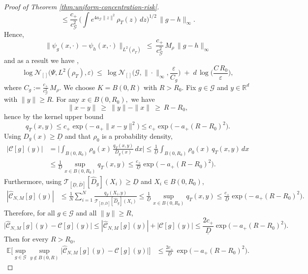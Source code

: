 \documentclass[11pt]{article}
\theoremstyle{remark}
\numberwithin{equation}{section}
\newcommand{\R}{\mathbb{R}}
\def\amax{a_{+}}
\def\cmax{c_{+}}
\def\aGmin{a_{\mathcal{G}}}
\def\cGmin{c_{\mathcal{G}}}
\begin{document}
\begin{proof}[Proof of Theorem \ref{thm:uniform-concentration-risk}]
\[  \le
  \frac{\cmax}{\cGmin^2}\,
  \Big(\int e^{4\aGmin\|z\|^2}\rho_T(z)\,dz\Big)^{1/2}\,
  \|g-h\|_\infty.
\]
Hence,
\begin{equation*}\label{eq:Psi-L2-Lip-infty}
  \|\psi_g(x,\cdot)-\psi_h(x,\cdot)\|_{L^2(\rho_T)}
  \ \le\
  \frac{\cmax}{\cGmin^2}\,M_\rho\,\|g-h\|_\infty
\end{equation*}
and as a result we have ,
\[
  \log \mathcal N_{[]}\!\big(\Psi,L^2(\rho_T), \varepsilon\big)
  \ \le\
  \log \mathcal N_{[]}\!\Big(\mathcal G,\|\cdot\|_\infty,\frac{\varepsilon}{C_g}\Big)
  \;+\;
  d\,\log\!\Big(\frac{C\,R_0}{\varepsilon}\Big),
\]
where \( C_g:=\frac{\cmax}{\cGmin^2}\,M_\rho.\)
We choose $K = B(0, R)$ with $R>R_0.$ Fix $g\in\mathcal G$ and $y\in\R^d$ with $\|y\|\ge R$. For any $x\in B(0,R_0),$ we have
\[
  \|x-y\|\ \ge\ \|y\|-\|x\|\ \ge\ R-R_0,
\]
hence by the kernel upper bound
\[
  q_T(x,y)\le \cmax \exp\!\bigl(-\amax\|x-y\|^2\bigr)
  \le \cmax \exp\!\bigl(-\amax (R-R_0)^2\bigr).
\]
Using $D_g(x)\ge \underline D$ and that $\rho_0$ is a probability density,
\begin{align*}
  |\mathcal C[g](y)|
  &=
  \Big|\int_{B(0,R_0)} \rho_0(x)\,\frac{q_T(x,y)}{D_g(x)}\,dx\Big|
  \le
  \frac{1}{\underline D}\int_{B(0,R_0)}\rho_0(x)\,q_T(x,y)\,dx\\
  &\le
  \frac{1}{\underline D}\sup_{x\in B(0,R_0)}q_T(x,y)
  \le
  \frac{\cmax}{\underline D}\exp\!\bigl(-\amax (R-R_0)^2\bigr).
\end{align*}
Furthermore, using $\mathcal{T}_{[\underline{D},\overline{D}]}[\widehat D_g](X_i)\ge \underline D$ and $X_i\in B(0,R_0)$,
\begin{align*}
  |\widehat{\mathcal C}_{N,M}[g](y)|
  &\le
  \frac{1}{N}\sum_{i=1}^N \frac{q_T(X_i,y)}{\mathcal{T}_{[\underline{D},\overline{D}]}[\widehat D_g](X_i)}
  \le
  \frac{1}{\underline D}\sup_{x\in B(0,R_0)} q_T(x,y)
  \le
  \frac{\cmax}{\underline D}\exp\!\bigl(-\amax (R-R_0)^2\bigr).
\end{align*}
Therefore, for all $g\in\mathcal G$ and all $\|y\|\ge R$,
\[
  \big|\widehat{\mathcal C}_{N,M}[g](y)-\mathcal C[g](y)\big|
  \le
  |\widehat{\mathcal C}_{N,M}[g](y)|+|\mathcal C[g](y)|
  \le
  \frac{2\cmax}{\underline D}\exp\!\bigl(-\amax (R-R_0)^2\bigr).
\]
Then for every $R>R_0$,
\begin{align}
\mathbb{E}\Bigg[
  \sup_{g\in\mathcal{G}}\sup_{y\not\in B(0,R)}
      \bigl|
        \widehat{\mathcal{C}}_{N,M}[g](y) - \mathcal{C}[g](y)
      \bigr|
\Bigg]
&\le
\frac{2\cmax}{\underline D}\,
\exp\!\bigl(-\amax (R-R_0)^2\bigr).
\label{eq:tail-outside-ball}
\end{align}
 
\end{proof}
\end{document}
